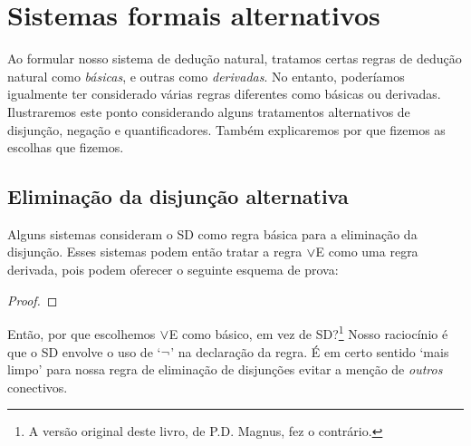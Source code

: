 
\chapter{Sistemas formais alternativos}
Ao formular nosso sistema de dedução natural, tratamos certas regras de dedução natural como \emph{básicas}, e outras como \emph{derivadas}. No entanto, poderíamos igualmente ter considerado várias regras diferentes como básicas ou derivadas. Ilustraremos este ponto considerando alguns tratamentos alternativos de disjunção, negação e quantificadores. Também explicaremos por que fizemos as escolhas que fizemos. 

\section{Eliminação da disjunção alternativa}
Alguns sistemas consideram o SD como regra básica para a eliminação da disjunção. Esses sistemas podem então tratar a regra $\vee$E como uma regra derivada, pois podem oferecer o seguinte esquema de prova: 
\begin{proof}
  \open
     {}
  \close
  \open
  \close
  \open
    \open
    \close
  \close
\end{proof}
Então, por que escolhemos $\vee$E como básico, em vez de SD?\footnote{A versão original deste livro, de P.D. Magnus, fez o contrário.} Nosso raciocínio é que o SD envolve o uso de `$\neg$' na declaração da regra. É em certo sentido `mais limpo' para nossa regra de eliminação de disjunções evitar a menção de \emph{outros} conectivos. 

